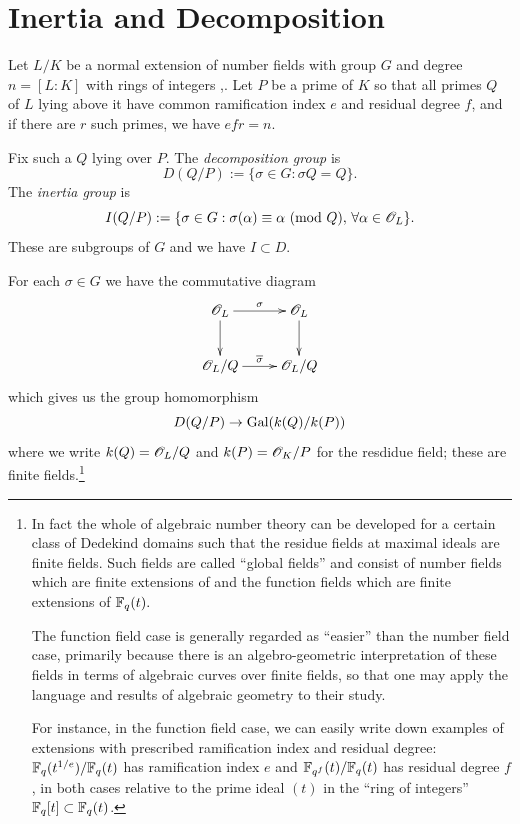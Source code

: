 \documentclass[10pt,a4paper]{amsart}
\begin{document}

\section{Inertia and Decomposition}

\begin{defns}
Let $L/K$ be a normal extension of number fields with group $G$ and degree $n =
[L:K]$ with rings of integers \OL,\OK. Let $P$ be a prime of $K$ so that all
primes $Q$ of $L$ lying above it have common ramification index $e$ and
residual degree $f$, and if there are $r$ such primes, we have $efr = n$.

Fix such a $Q$ lying over $P$. The \emph{decomposition group} is \[D(Q/P):=
\{\sigma\in G : \sigma Q = Q\}.\] The \emph{inertia group} is \[I(Q/P) :=
\{\sigma\in G : \sigma(\alpha) \equiv \alpha \text{ } (\mathrm{mod}\text{ } Q), \, \forall \alpha\in
\mathscr{O}_L\}.\] These are subgroups of $G$ and we have $I\subset D.$
\end{defns}

For each $\sigma\in G$ we have the commutative diagram \[ \xymatrix{ \OL
\ar[r]^\sigma \ar[d]& \OL\ar[d]\\ \OL/Q \ar[r]^{\overline{\sigma}} & \OL/Q }
\] which gives us the group homomorphism \[D(Q/P) \rightarrow \mathrm{Gal}(k(Q)/k(P))\]
where we write $k(Q) = \mathscr{O}_L/Q$ and $k(P) = \mathscr{O}_K/P$ for the resdidue field; these
are finite fields.\footnote{In fact the whole of algebraic number theory can be
developed for a certain class of Dedekind domains such that the residue
fields at maximal ideals are finite fields. Such fields are called ``global
fields'' and consist of number fields which are finite extensions of \Q{} and
the function fields which are finite extensions of ${\mathbb{F}_q}(t).$

The function field case is generally regarded as ``easier'' than the number
field case, primarily because there is an algebro-geometric interpretation of
these fields in terms of algebraic curves over finite fields, so that one may
apply the language and results of algebraic geometry to their study.

For instance, in the function field case, we can easily write down examples of
extensions with prescribed ramification index and residual degree:
${\mathbb{F}_q}(t^{1/e})/{\mathbb{F}_q}(t)$ has ramification index $e$ and
$\mathbb{F}_{q^f}(t)/{\mathbb{F}_q}(t)$ has residual degree $f$, in both cases relative to
the prime ideal $(t)$ in the ``ring of integers'' ${\mathbb{F}_q}[t] \subset {\mathbb{F}_q}(t)$.}
\end{document}
